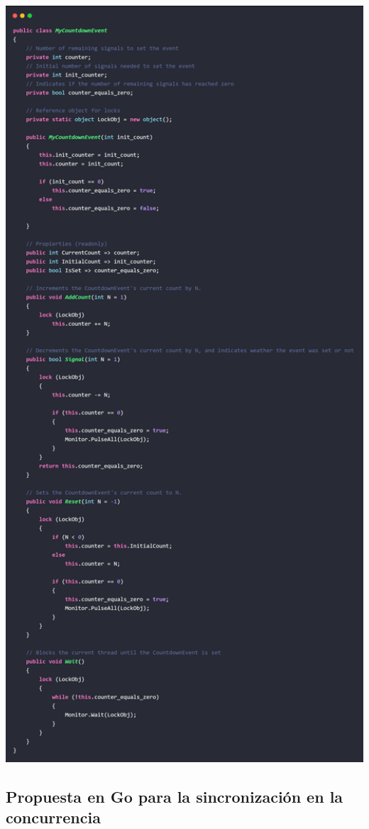 \documentclass[10pt]{article} %
\begin{document}
\includegraphics[width=15cm]{MyCountdownEvent.jpg}

\subsection{Propuesta en Go para la sincronización en la concurrencia}
\end{document}
